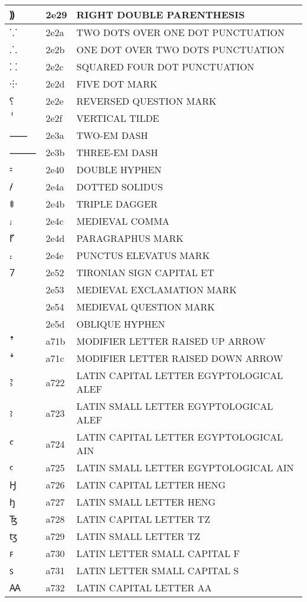 \documentclass[12pt,letterpaper,openany]{book}
\begin{document}
\begin{center}
\begin{supertabular}{|m{0.25in}|m{0.5in}|m{4in}|}
⸩ & 2e29 & RIGHT DOUBLE PARENTHESIS\\\hline
⸪ & 2e2a & TWO DOTS OVER ONE DOT PUNCTUATION\\\hline
⸫ & 2e2b & ONE DOT OVER TWO DOTS PUNCTUATION\\\hline
⸬ & 2e2c & SQUARED FOUR DOT PUNCTUATION\\\hline
⸭ & 2e2d & FIVE DOT MARK\\\hline
⸮ & 2e2e & REVERSED QUESTION MARK\\\hline
ⸯ & 2e2f & VERTICAL TILDE\\\hline
⸺ & 2e3a & TWO-EM DASH\\\hline
⸻ & 2e3b & THREE-EM DASH\\\hline
⹀ & 2e40 & DOUBLE HYPHEN\\\hline
⹊ & 2e4a & DOTTED SOLIDUS\\\hline
⹋ & 2e4b & TRIPLE DAGGER\\\hline
⹌ & 2e4c & MEDIEVAL COMMA\\\hline
⹍ & 2e4d & PARAGRAPHUS MARK\\\hline
⹎ & 2e4e & PUNCTUS ELEVATUS MARK\\\hline
⹒ & 2e52 & TIRONIAN SIGN CAPITAL ET\\\hline
⹓ & 2e53 & MEDIEVAL EXCLAMATION MARK\\\hline
⹔ & 2e54 & MEDIEVAL QUESTION MARK\\\hline
⹝ & 2e5d & OBLIQUE HYPHEN\\\hline
ꜛ & a71b & MODIFIER LETTER RAISED UP ARROW\\\hline
ꜜ & a71c & MODIFIER LETTER RAISED DOWN ARROW\\\hline
Ꜣ & a722 & LATIN CAPITAL LETTER EGYPTOLOGICAL ALEF\\\hline
ꜣ & a723 & LATIN SMALL LETTER EGYPTOLOGICAL ALEF\\\hline
Ꜥ & a724 & LATIN CAPITAL LETTER EGYPTOLOGICAL AIN\\\hline
ꜥ & a725 & LATIN SMALL LETTER EGYPTOLOGICAL AIN\\\hline
Ꜧ & a726 & LATIN CAPITAL LETTER HENG\\\hline
ꜧ & a727 & LATIN SMALL LETTER HENG\\\hline
Ꜩ & a728 & LATIN CAPITAL LETTER TZ\\\hline
ꜩ & a729 & LATIN SMALL LETTER TZ\\\hline
ꜰ & a730 & LATIN LETTER SMALL CAPITAL F\\\hline
ꜱ & a731 & LATIN LETTER SMALL CAPITAL S\\\hline
Ꜳ & a732 & LATIN CAPITAL LETTER AA\\\hline

\end{supertabular}
\end{center}
\end{document}
